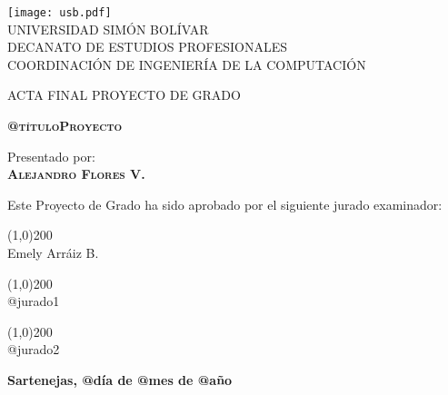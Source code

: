 \begin{titlepage}
\begin{center}

\texttt{[image: usb.pdf]} \\

\textsc {\large UNIVERSIDAD SIMÓN BOLÍVAR} \\
\textsc{DECANATO DE ESTUDIOS PROFESIONALES\\
COORDINACIÓN DE INGENIERÍA DE LA COMPUTACIÓN}

\bigskip
\bigskip
\bigskip
\bigskip
\bigskip
\bigskip

\textsc{ACTA FINAL PROYECTO DE GRADO}

\bigskip
\bigskip

\textsc{\bfseries @títuloProyecto}

\bigskip
\bigskip
\bigskip
\bigskip

\begin{minipage}{\textwidth}
\centering
Presentado por: \\
\textsc{\bfseries Alejandro Flores V.} \\

\bigskip
\bigskip
\bigskip

Este Proyecto de Grado ha sido aprobado por el siguiente jurado examinador: \\

\bigskip
\bigskip

\line(1,0){200} \\
Emely Arráiz B.\\

\bigskip
\bigskip

\line(1,0){200} \\
@jurado1\\

\bigskip
\bigskip

\line(1,0){200} \\
@jurado2\\
\end{minipage}

\bigskip
\bigskip
\vfill

{\large \bfseries Sartenejas, @día de @mes de @año}

\end{center}
\end{titlepage}
